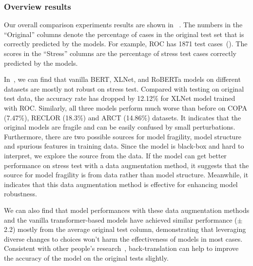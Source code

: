 \subsubsection{Overview results}
\label{sec:overview}

Our overall comparison experiments results are shown in ~.
The numbers in the ``Original'' columns denote the percentage of cases in the original test set that is correctly predicted by the models. 
For example, ROC has 1871 test cases~().
The scores in the ``Stress'' columns are the percentage of
stress test cases correctly predicted by the models.

In~, we can find that vanilla BERT, XLNet, and RoBERTa models on different 
datasets are mostly not robust on stress test.
Compared with testing on original test data, 
the accuracy rate has dropped by 12.12\% for XLNet model trained with ROC. 
Similarly, all three models perform much 
worse than before on COPA (7.47\%), RECLOR (18.3\%) and ARCT (14.86\%) datasets. 
It indicates that the original models are fragile and can be easily confused by 
small perturbations. Furthermore, there are two possible sources for model fragility, 
model structure and spurious features in training data. 
Since the model is black-box and hard to interpret, 
we explore the source from the data. 
If the model can get better performance on stress test with a 
data augmentation method, it suggests that the source for model fragility
is from data rather than model structure. 
Meanwhile, it indicates that this data augmentation 
method is effective for enhancing model robustness.

We can also find that model performances with these data augmentation 
methods and the vanilla transformer-based models 
have achieved similar performance ($\pm$2.2) mostly from the average original test column, 
demonstrating that leveraging diverse changes to choices won't harm the effectiveness of models 
in most cases. Consistent with other people's research~\cite{chen-etal-2021-hiddencut}, 
back-translation can help to improve the accuracy of the model on the original tests slightly. 

